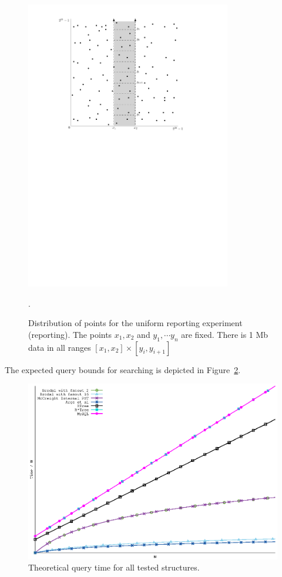 \documentclass[twoside,11pt,openright]{report}
\begin{document}
\begin{figure}[h]
	\centering
	\includegraphics[width=0.8\textwidth]{../figures/query_uniform_fix_x}
	\caption{Distribution of points for the uniform reporting experiment (reporting). The points $x_1, x_2$ and $y_1, \cdots y_n$ are fixed. There is 1 Mb data in all ranges $[x_1, x_2] \times [y_i, y_{i+1}]$}.
	\label{fig:experiment_query_uniform_fix_x}
\end{figure}

The expected query bounds for searching is depicted in Figure~\ref{fig:theory_query_complexity}.

\begin{figure}[htp!]
\includegraphics[width=\textwidth]{../plots/query_complexities/query_complexity}
\caption{Theoretical query time for all tested structures.}
\label{fig:theory_query_complexity}
\end{figure}
\end{document}
